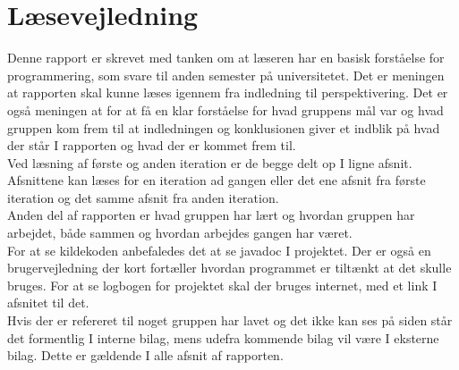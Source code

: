 \chapter{Læsevejledning}
Denne rapport er skrevet med tanken om at læseren har en basisk forståelse for programmering, som svare til anden semester på universitetet. Det er meningen at rapporten skal kunne læses igennem fra indledning til perspektivering. Det er også meningen at for at få en klar forståelse for hvad gruppens mål var og hvad gruppen kom frem til at indledningen og konklusionen giver et indblik på hvad der står I rapporten og hvad der er kommet frem til. \\
Ved læsning af første og anden iteration er de begge delt op I ligne afsnit. Afsnittene kan læses for en iteration ad gangen eller det ene afsnit fra første iteration og det samme afsnit fra anden iteration. \\
Anden del af rapporten er hvad gruppen har lært og hvordan gruppen har arbejdet, både sammen og hvordan arbejdes gangen har været. \\
For at se kildekoden anbefaledes det at se javadoc I projektet. Der er også en brugervejledning der kort fortæller hvordan programmet er tiltænkt at det skulle bruges. For at se logbogen for projektet skal der bruges internet, med et link I afsnitet til det. \\
Hvis der er refereret til noget gruppen har lavet og det ikke kan ses på siden står det formentlig I interne bilag, mens udefra kommende bilag vil være I eksterne bilag. Dette er gældende I alle afsnit af rapporten. \\

